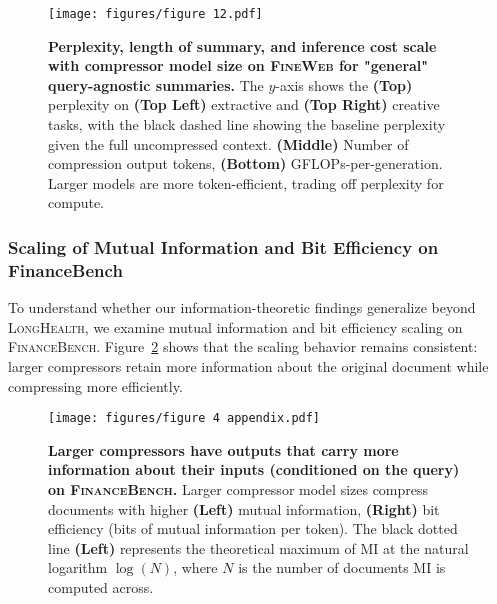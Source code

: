 \documentclass{article} %
\begin{document}
\begin{figure}[h!]
    \centering
    \texttt{[image: figures/figure 12.pdf]}
    \caption{\textbf{Perplexity, length of summary, and inference cost scale with compressor model size on \textsc{FineWeb} for "general" query-agnostic summaries.} The $y$-axis shows the \textbf{(Top)} perplexity on \textbf{(Top Left)} extractive and \textbf{(Top Right)} creative tasks, with the black dashed line showing the baseline perplexity given the full uncompressed context. \textbf{(Middle)} Number of compression output tokens, \textbf{(Bottom)} GFLOPs-per-generation. Larger models are more token-efficient, trading off perplexity for compute.}
    \label{fig:figure-12-fineweb-general}
\end{figure}

\subsubsection{Scaling of Mutual Information and Bit Efficiency on FinanceBench}
\label{sec:financebench-mi-appendix}
To understand whether our information-theoretic findings generalize beyond \textsc{LongHealth}, we examine mutual information and bit efficiency scaling on \textsc{FinanceBench}. Figure~\ref{fig:figure-4-appendix} shows that the scaling behavior remains consistent: larger compressors retain more information about the original document while compressing more efficiently.

\begin{figure}[h!]
    \centering
    \texttt{[image: figures/figure 4 appendix.pdf]}
    \caption{\textbf{Larger compressors have outputs that carry more information about their inputs (conditioned on the query) on \textsc{FinanceBench}.} Larger compressor model sizes compress documents with higher \textbf{(Left)} mutual information, \textbf{(Right)} bit efficiency (bits of mutual information per token). The black dotted line \textbf{(Left)} represents the theoretical maximum of MI at the natural logarithm $\log(N)$, where $N$ is the number of documents MI is computed across.}
    \label{fig:figure-4-appendix}
\end{figure}
\end{document}
